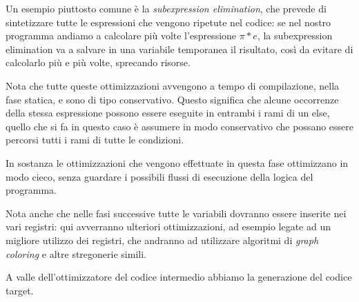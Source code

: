 \documentclass[class=book, crop=false, oneside, 12pt]{standalone}
\begin{document}
Un esempio piuttosto comune è la \emph{subexpression elimination}, che prevede di sintetizzare tutte le espressioni che vengono ripetute nel codice: se nel nostro programma andiamo a calcolare più volte l'espressione \(\pi * e\), la subexpression elimination va a salvare in una variabile temporanea il risultato, così da evitare di calcolarlo più e più volte, sprecando risorse.

Nota che tutte queste ottimizzazioni avvengono a tempo di compilazione, nella fase statica, e sono di tipo conservativo. Questo significa che alcune occorrenze della stessa espressione possono essere eseguite in entrambi i rami di un else, quello che si fa in questo caso è assumere in modo conservativo che possano essere percorsi tutti i rami di tutte le condizioni.

In sostanza le ottimizzazioni che vengono effettuate in questa fase ottimizzano in modo cieco, senza guardare i possibili flussi di esecuzione della logica del programma.

Nota anche che nelle fasi successive tutte le variabili dovranno essere inserite nei vari registri: qui avverranno ulteriori ottimizzazioni, ad esempio legate ad un migliore utilizzo dei registri, che andranno ad utilizzare algoritmi di \emph{graph coloring} e altre stregonerie simili.

A valle dell'ottimizzatore del codice intermedio abbiamo la generazione del codice target.
\end{document}
